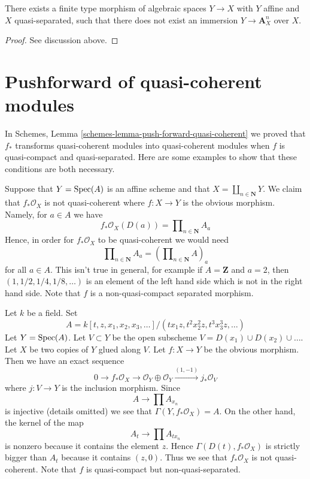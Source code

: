 \begin{lemma}
\label{lemma-cannot-embed-into-affine}
There exists a finite type morphism of algebraic spaces $Y \to X$
with $Y$ affine and $X$ quasi-separated, such that there does not exist
an immersion $Y \to \mathbf{A}^n_X$ over $X$.
\end{lemma}

\begin{proof}
See discussion above.
\end{proof}










\section{Pushforward of quasi-coherent modules}
\label{section-push-quasi-coherent}

\noindent
In Schemes, Lemma \ref{schemes-lemma-push-forward-quasi-coherent}
we proved that $f_*$ transforms quasi-coherent modules into quasi-coherent
modules when $f$ is quasi-compact and quasi-separated. Here are some
examples to show that these conditions are both necessary.

\medskip\noindent
Suppose that $Y = \mathop{\mathrm{Spec}}(A)$ is an affine scheme and that
$X = \coprod_{n \in \mathbf{N}} Y$. We claim that $f_*\mathcal{O}_X$
is not quasi-coherent where $f : X \to Y$ is the obvious morphism.
Namely, for $a \in A$ we have
$$
f_*\mathcal{O}_X(D(a)) = \prod\nolimits_{n \in \mathbf{N}} A_a
$$
Hence, in order for $f_*\mathcal{O}_X$ to be quasi-coherent we would need
$$
\prod\nolimits_{n \in \mathbf{N}} A_a
=
\left(\prod\nolimits_{n \in \mathbf{N}} A\right)_a
$$
for all $a \in A$. This isn't true in general, for example if
$A = \mathbf{Z}$ and $a = 2$, then $(1, 1/2, 1/4, 1/8, \ldots)$
is an element of the left hand side which is not in the right hand side.
Note that $f$ is a non-quasi-compact separated morphism.

\medskip\noindent
Let $k$ be a field. Set
$$
A = k[t, z, x_1, x_2, x_3, \ldots]/(tx_1z, t^2x_2^2z, t^3x_3^3z, \ldots)
$$
Let $Y = \mathop{\mathrm{Spec}}(A)$. Let $V \subset Y$ be the open subscheme
$V = D(x_1) \cup D(x_2) \cup \ldots$. Let $X$ be two copies of $Y$
glued along $V$. Let $f : X \to Y$ be the obvious morphism. Then we
have an exact sequence
$$
0 \to f_*\mathcal{O}_X \to
\mathcal{O}_Y \oplus \mathcal{O}_Y \xrightarrow{(1, -1)} j_*\mathcal{O}_V
$$
where $j : V \to Y$ is the inclusion morphism. Since
$$
A \longrightarrow \prod A_{x_n}
$$
is injective (details omitted) we see that $\Gamma(Y, f_*\mathcal{O}_X) = A$.
On the other hand, the kernel of the map
$$
A_t \longrightarrow \prod A_{tx_n}
$$
is nonzero because it contains the element $z$. Hence
$\Gamma(D(t), f_*\mathcal{O}_X)$ is strictly bigger than
$A_t$ because it contains $(z, 0)$. Thus we see that $f_*\mathcal{O}_X$
is not quasi-coherent. Note that $f$ is quasi-compact but
non-quasi-separated.

